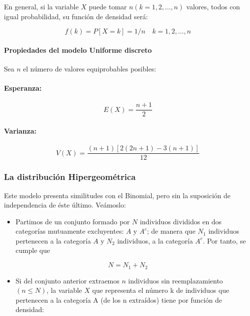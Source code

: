 \documentclass[
]{article}
\providecommand{\tightlist}{%
  \setlength{\itemsep}{0pt}\setlength{\parskip}{0pt}}
\begin{document}
En general, si la variable \(X\) puede tomar \(n(k=1,2, \ldots, n)\) valores, todos con igual probabilidad, su función de densidad será:

\[
f(k)=P[X=k]=1 / n \quad k=1,2, \ldots, n
\]

\paragraph{Propiedades del modelo Uniforme discreto}\label{propiedades-del-modelo-uniforme-discreto}

Sea \(n\) el número de valores equiprobables posibles:

\paragraph{Esperanza:}\label{esperanza-1}

\[
E(X)=\frac{n+1}{2}
\]

\paragraph{Varianza:}\label{varianza-1}

\[
V(X)=\frac{(n+1)[2(2 n+1)-3(n+1)]}{12}
\]

\subsubsection{La distribución Hipergeométrica}\label{la-distribuciuxf3n-hipergeomuxe9trica}

Este modelo presenta similitudes con el Binomial, pero sin la suposición de independencia de éste último. Veámoslo:

\begin{itemize}
\tightlist
\item
  Partimos de un conjunto formado por \(N\) individuos divididos en dos categorías mutuamente excluyentes: \(A\) y \(A^{c}\); de manera que \(N_{1}\) individuos pertenecen a la categoría \(A\) y \(N_{2}\) individuos, a la categoría \(A^{c}\). Por tanto, se cumple que
\end{itemize}

\[
N=N_{1}+N_{2}
\]

\begin{itemize}
\tightlist
\item
  Si del conjunto anterior extraemos \(n\) individuos sin reemplazamiento \((n \leq N)\), la variable \(X\) que representa el número k de individuos que pertenecen a la categoría A (de los n extraídos) tiene por función de densidad:
\end{itemize}
\end{document}
